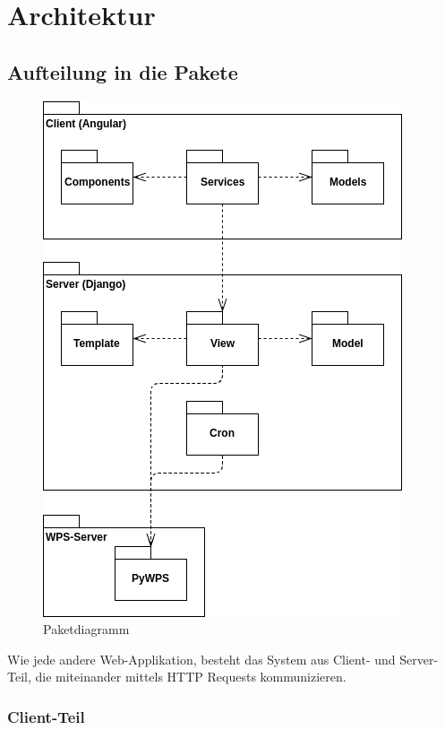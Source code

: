\chapter{Architektur}

    \section{Aufteilung in die Pakete}
    
    \begin{figure}[h]
        \centering
        \includegraphics[scale=0.77]{images/package_diagram.png}
        \caption{Paketdiagramm}
        \label{fig:arch_package_division}
    \end{figure}
    
    \noindent Wie jede andere Web-Applikation, besteht das System aus Client- und Server-Teil, die miteinander mittels HTTP Requests kommunizieren.
    
        \subsection{Client-Teil}
        
